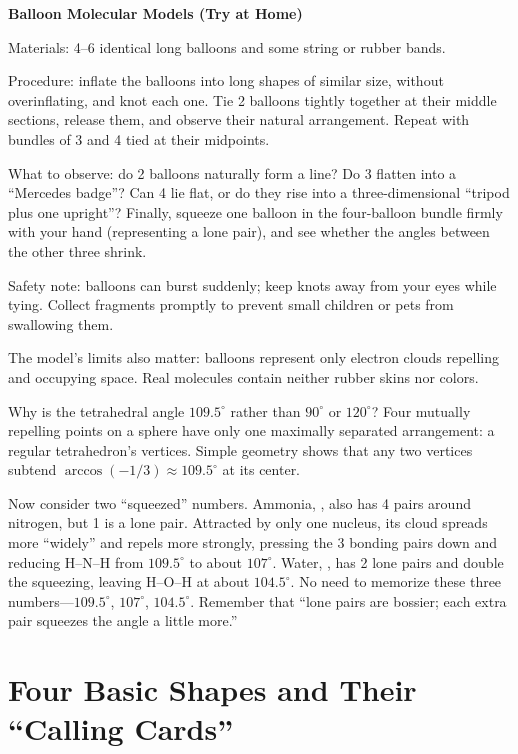 \begin{shiyan}
\textbf{Balloon Molecular Models (Try at Home)}

Materials: 4--6 identical long balloons and some string or rubber bands.

Procedure: inflate the balloons into long shapes of similar size, without overinflating, and knot each one. Tie 2 balloons tightly together at their middle sections, release them, and observe their natural arrangement. Repeat with bundles of 3 and 4 tied at their midpoints.

What to observe: do 2 balloons naturally form a line? Do 3 flatten into a ``Mercedes badge''? Can 4 lie flat, or do they rise into a three-dimensional ``tripod plus one upright''? Finally, squeeze one balloon in the four-balloon bundle firmly with your hand (representing a lone pair), and see whether the angles between the other three shrink.

Safety note: balloons can burst suddenly; keep knots away from your eyes while tying. Collect fragments promptly to prevent small children or pets from swallowing them.

The model's limits also matter: balloons represent only electron clouds repelling and occupying space. Real molecules contain neither rubber skins nor colors.
\end{shiyan}

\begin{qiaoliang}
Why is the tetrahedral angle $109.5^{\circ}$ rather than $90^{\circ}$ or $120^{\circ}$? Four mutually repelling points on a sphere have only one maximally separated arrangement: a regular tetrahedron's vertices. Simple geometry shows that any two vertices subtend $\arccos(-1/3) \approx 109.5^{\circ}$ at its center.

Now consider two ``squeezed'' numbers. Ammonia, , also has 4 pairs around nitrogen, but 1 is a lone pair. Attracted by only one nucleus, its cloud spreads more ``widely'' and repels more strongly, pressing the 3 bonding pairs down and reducing H--N--H from $109.5^{\circ}$ to about $107^{\circ}$. Water, , has 2 lone pairs and double the squeezing, leaving H--O--H at about $104.5^{\circ}$. No need to memorize these three numbers---$109.5^{\circ}$, $107^{\circ}$, $104.5^{\circ}$. Remember that ``lone pairs are bossier; each extra pair squeezes the angle a little more.''
\end{qiaoliang}

\section{Four Basic Shapes and Their ``Calling Cards''}

